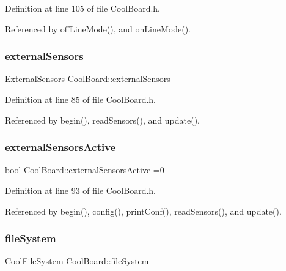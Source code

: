 Definition at line 105 of file Cool\+Board.\+h.



Referenced by off\+Line\+Mode(), and on\+Line\+Mode().

\mbox{\label{classCoolBoard_a09e26264839c65873eb56af476eff6b2}} 
\subsubsection{\texorpdfstring{external\+Sensors}{externalSensors}}
{\footnotesize\ttfamily \hyperlink{classExternalSensors}{External\+Sensors} Cool\+Board\+::external\+Sensors\hspace{0.3cm}{\ttfamily [private]}}



Definition at line 85 of file Cool\+Board.\+h.



Referenced by begin(), read\+Sensors(), and update().

\mbox{\label{classCoolBoard_a638b00b76aeb819ecfd4c10b8cdd7bb7}} 
\subsubsection{\texorpdfstring{external\+Sensors\+Active}{externalSensorsActive}}
{\footnotesize\ttfamily bool Cool\+Board\+::external\+Sensors\+Active =0\hspace{0.3cm}{\ttfamily [private]}}



Definition at line 93 of file Cool\+Board.\+h.



Referenced by begin(), config(), print\+Conf(), read\+Sensors(), and update().

\mbox{\label{classCoolBoard_a42c2586fbb13ff7f06538e9284e8538d}} 
\subsubsection{\texorpdfstring{file\+System}{fileSystem}}
{\footnotesize\ttfamily \hyperlink{classCoolFileSystem}{Cool\+File\+System} Cool\+Board\+::file\+System\hspace{0.3cm}{\ttfamily [private]}}



